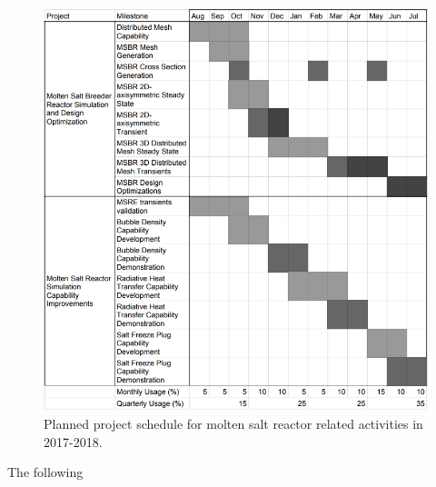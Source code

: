 \documentclass[letterpaper]{article}
\begin{document}
\begin{figure}[htbp!]
\begin{center}
        \includegraphics[width=\textwidth]{proj.png}
\end{center}
\caption{Planned project schedule for molten salt reactor related activities in 2017-2018.}
\label{fig:proj}
\end{figure}

The following 
\end{document}

